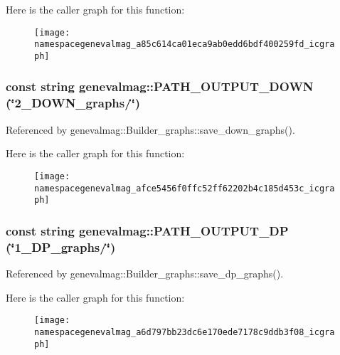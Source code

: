 Here is the caller graph for this function:\nopagebreak
\begin{figure}[H]
\begin{center}
\leavevmode
\texttt{[image: namespacegenevalmag\_a85c614ca01eca9ab0edd6bdf400259fd\_icgraph]}
\end{center}
\end{figure}


\hypertarget{namespacegenevalmag_afce5456f0ffc52ff62202b4c185d453c}{
\subsubsection[{PATH\_\-OUTPUT\_\-DOWN}]{\setlength{\rightskip}{0pt plus 5cm}const string genevalmag::PATH\_\-OUTPUT\_\-DOWN (\char`\"{}2\_\-DOWN\_\-graphs/\char`\"{})}}
\label{namespacegenevalmag_afce5456f0ffc52ff62202b4c185d453c}


Referenced by genevalmag::Builder\_\-graphs::save\_\-down\_\-graphs().



Here is the caller graph for this function:\nopagebreak
\begin{figure}[H]
\begin{center}
\leavevmode
\texttt{[image: namespacegenevalmag\_afce5456f0ffc52ff62202b4c185d453c\_icgraph]}
\end{center}
\end{figure}


\hypertarget{namespacegenevalmag_a6d797bb23dc6e170ede7178c9ddb3f08}{
\subsubsection[{PATH\_\-OUTPUT\_\-DP}]{\setlength{\rightskip}{0pt plus 5cm}const string genevalmag::PATH\_\-OUTPUT\_\-DP (\char`\"{}1\_\-DP\_\-graphs/\char`\"{})}}
\label{namespacegenevalmag_a6d797bb23dc6e170ede7178c9ddb3f08}


Referenced by genevalmag::Builder\_\-graphs::save\_\-dp\_\-graphs().



Here is the caller graph for this function:\nopagebreak
\begin{figure}[H]
\begin{center}
\leavevmode
\texttt{[image: namespacegenevalmag\_a6d797bb23dc6e170ede7178c9ddb3f08\_icgraph]}
\end{center}
\end{figure}


